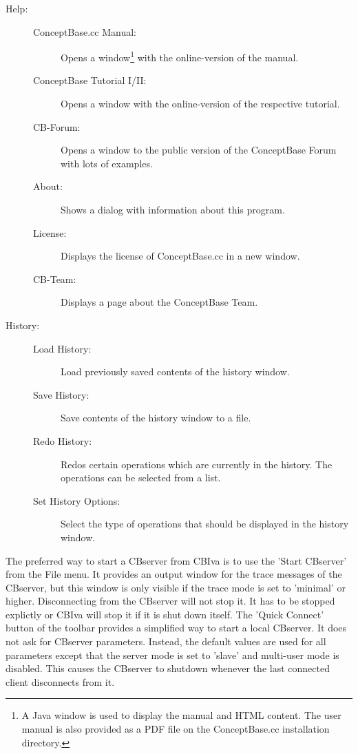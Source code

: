\begin{description}
\item[Help:]
	\begin{description}
	\item[ConceptBase.cc Manual:] Opens a window\footnote{A Java window is used to display the manual and HTML content. The user manual is also provided as a PDF file on the ConceptBase.cc installation directory.}
with the online-version of the manual.
	\item[ConceptBase Tutorial I/II:] Opens a window with the online-version of the respective tutorial.
	\item[CB-Forum:] Opens a window to the public version of the ConceptBase Forum with lots of
              examples.
	\item[About:] Shows a dialog with information about this program.
	\item[License:] Displays the license of ConceptBase.cc in a new window.
	\item[CB-Team:] Displays a page about the ConceptBase Team.
	\end{description}
\item[History:]
	\begin{description}
	\item[Load History:] Load previously saved contents of the history window.
	\item[Save History:] Save contents of the history window to a file.
	\item[Redo History:] Redos certain operations which are currently in the history. The operations
	can be selected from a list.
	\item[Set History Options:] Select the type of operations that should be displayed in the history window.
	\end{description}
\end{description}



The preferred way to start a CBserver from CBIva is to use the 'Start CBserver' from the File menu.
It provides an output window for the trace messages of the CBserver, but this window is only visible
if the trace mode is set to 'minimal' or higher. Disconnecting from the CBserver will not stop
it. It has to be stopped explictly or CBIva will stop it if it is shut down itself.
The 'Quick Connect' button of the toolbar provides a simplified way to start a local CBserver.
It does not ask for CBserver parameters. Instead, the default values are used for all parameters
except that the server mode is set to 'slave' and multi-user mode is disabled.
This causes the CBserver to shutdown whenever the last connected client disconnects from it.

